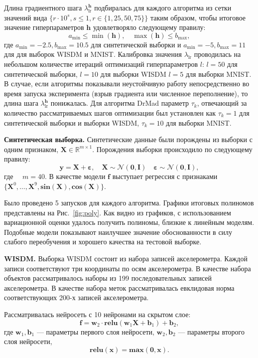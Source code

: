 Длина градиентного шага $ \lambda_{\text{lr}}^{\mathbf{h}}$ подбиралась для каждого алгоритма из сетки значений вида $\{r \cdot 10^{s}, s \leq 1, r \in \{1,25,50,75\}\}$  таким образом, чтобы итоговое значение гиперпараметров  $\mathbf{h}$  удовлетворяло следующему правилу:
\[
    a_\text{min} \leq  \min(\mathbf{h}), \quad \max(\mathbf{h}) \leq b_\text{max},
\] 
где  $a_\text{min} = -2.5, b_\text{max}=10.5$ для синтетической выборки и $a_\text{min} = -5, b_\text{max}=11$ для для выборок WISDM и MNIST.
Калибровка значения $ \lambda_{\text{lr}}$ проводилась на небольшом количестве итераций оптимизаций гиперпараметров $l$:
$l = 50$ для синтетической выборки,  $l=10$ для выборки WISDM $l=5$ для выборки MNIST. В случае, если алгоритмы показывали неустойчивую работу непосредственно во время запуска эксперимента (взрыв градиента или численное переполнение), то длина шага $ \lambda_{\text{lr}}^\mathbf{h}$ понижалась. Для алгоритма DrMad параметр $\tau_k$, отвечающий за количество рассматриваемых шагов оптимизации был установлен как $\tau_k=1$ для синтетической выборки и выборки WISDM, $\tau_k=10$ для выборки MNIST.



\textbf{Синтетическая выборка. }
Синтетические данные были порождены из выборки с одним признаком, $\mathbf{X} \in \mathbb{R}^{m \times 1}$.
Порождения выборки происходило по следующему правилу:
\[
	\mathbf{y} = \mathbf{X} + \boldsymbol{\varepsilon},\quad \mathbf{X}  \sim \mathcal{N}(\mathbf{0}, \mathbf{I}) \quad \boldsymbol{\varepsilon} \sim \mathcal{N}(\mathbf{0}, \mathbf{I}),
\]
где $\quad m = 40.$
В качестве модели $\mathbf{f}$ выступает регрессия с признаками $\{\mathbf{X}^0, \dots, \mathbf{X}^9, \textbf{sin}(\mathbf{X}), \textbf{cos}(\mathbf{X})\}$.

Было проведено 5 запусков для каждого алгоритма.
Графики итоговых полиномов представлены на Рис.~\ref{fig:poly}. Как видно из графиков, с использованием вариационной оценки удалось получить полиномы, близкие к линейным моделям. Подобные модели показывают наилучшее значение обоснованности в силу слабого переобучения и хорошего качества на тестовой выборке. 


\textbf{WISDM. }
Выборка WISDM состоит из набора записей акселерометра. Каждой записи соответствуют три координаты по осям акселерометра. В качестве набора объектов рассматривалось наборы из 199 последовательных записей акселерометра. В качестве набора меток рассматривалась евклидовая норма соответствующих 200-х записей акселерометра.

Рассматривалась нейросеть с 10 нейронами на скрытом слое:
\[
    \mathbf{f} = \mathbf{w}_2 \cdot \textbf{relu}(\mathbf{w}_1\mathbf{X} + \mathbf{b}_1) +\mathbf{b}_2,
\]
где $\mathbf{w}_1, \mathbf{b}_1$ --- параметры первого слоя нейросети,
$\mathbf{w}_2, \mathbf{b}_2$ --- параметры второго слоя нейросети,
\[
    \textbf{relu}(\mathbf{x}) = \textbf{max}(\mathbf{0}, \mathbf{x}).
\]

